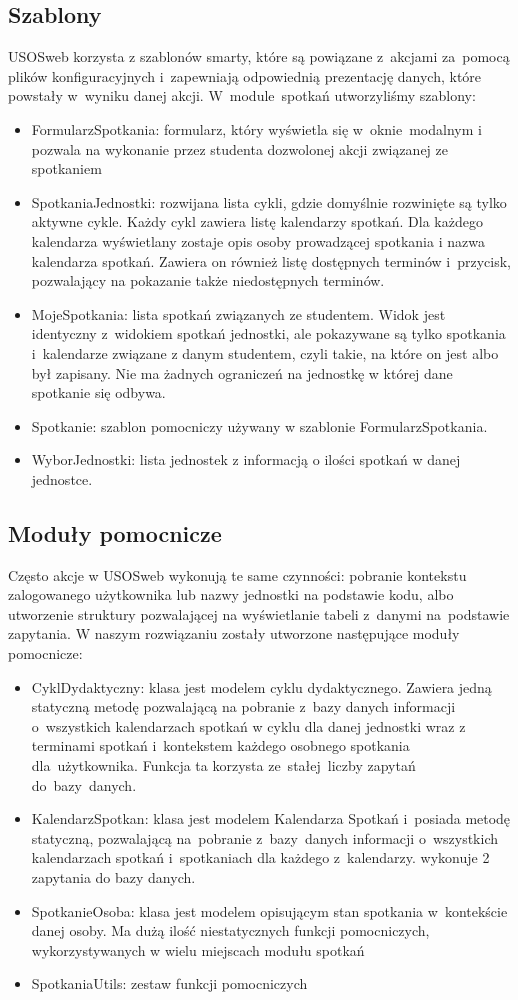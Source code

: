 \documentclass[licencjacka]{pracamgr}
\begin{document}
\subsection{Szablony}
USOSweb korzysta z szablonów smarty, które są powiązane z~akcjami za~pomocą plików konfiguracyjnych i~zapewniają odpowiednią prezentację danych, które powstały w~wyniku danej akcji. W~module~spotkań utworzyliśmy szablony:
\begin{itemize}
\item{FormularzSpotkania: formularz, który wyświetla się w~oknie~modalnym i pozwala na wykonanie przez studenta dozwolonej akcji związanej ze spotkaniem}
\item{SpotkaniaJednostki: rozwijana lista cykli, gdzie domyślnie rozwinięte są tylko aktywne cykle. Każdy cykl zawiera listę kalendarzy spotkań. Dla każdego kalendarza wyświetlany zostaje opis osoby prowadzącej spotkania i nazwa kalendarza spotkań. Zawiera on również listę dostępnych terminów i~przycisk, pozwalający na pokazanie także niedostępnych terminów.}
\item{MojeSpotkania: lista spotkań związanych ze studentem. Widok jest identyczny z~widokiem spotkań jednostki, ale pokazywane są tylko spotkania i~kalendarze związane z danym studentem, czyli takie, na które on jest albo był zapisany. Nie ma żadnych ograniczeń na jednostkę w której dane spotkanie się odbywa.}
\item{Spotkanie: szablon pomocniczy używany w szablonie FormularzSpotkania.}
\item{WyborJednostki: lista jednostek z informacją o ilości spotkań w danej jednostce.}
\end{itemize}
\subsection{Moduły pomocnicze}
Często akcje w USOSweb wykonują te same czynności: pobranie kontekstu zalogowanego użytkownika lub nazwy jednostki na podstawie kodu, albo utworzenie struktury pozwalającej na wyświetlanie tabeli z~danymi na~podstawie zapytania.
W naszym rozwiązaniu zostały utworzone następujące moduły pomocnicze:
\begin{itemize}
\item{CyklDydaktyczny: klasa jest modelem cyklu dydaktycznego. Zawiera jedną statyczną metodę pozwalającą na pobranie z~bazy danych informacji o~wszystkich kalendarzach spotkań w cyklu dla danej jednostki wraz z terminami spotkań i~kontekstem każdego osobnego spotkania dla~użytkownika. Funkcja ta korzysta ze~stałej~liczby zapytań do~bazy~danych.}
\item{KalendarzSpotkan: klasa jest modelem Kalendarza Spotkań i~posiada metodę statyczną, pozwalającą na~pobranie z~bazy~danych informacji o~wszystkich kalendarzach spotkań i~spotkaniach dla każdego z~kalendarzy. wykonuje 2 zapytania do bazy danych.}
\item{SpotkanieOsoba: klasa jest modelem opisującym stan spotkania w~kontekście danej osoby. Ma dużą ilość niestatycznych funkcji pomocniczych, wykorzystywanych w wielu miejscach modułu spotkań}
\item{SpotkaniaUtils: zestaw funkcji pomocniczych}
\end{itemize}
\end{document}
